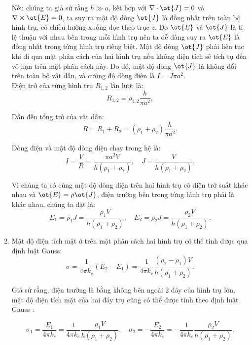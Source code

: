 \begin{loigiai}
\begin{enumerate}
{\begin{tikzpicture}[x=0.75pt,y=0.75pt,yscale=-1,xscale=1]
\end{tikzpicture}}
Nếu chúng ta giả sử rằng $h \gg a$, kết hợp với $\nabla\cdot \ot{J}=0$ và $\nabla \times \ot{E}=0$, ta suy ra mật độ dòng $\ot{J}$ là đồng nhất trên toàn bộ hình trụ, có chiều hướng xuống dọc theo trục $z$. Do $\ot{E}$ và $\ot{J}$ là tỉ lệ thuận với nhau bên trong mỗi hình trụ nên ta dễ dàng suy ra $\ot{E}$ là đồng nhất trong từng hình trụ riêng biệt. Mật độ dòng $\ot{J}$ phải liên tục khi đi qua mặt phân cách của hai hình trụ nếu không điện tích sẽ tích tụ đến vô hạn trên mặt phân cách này. Do đó, mật độ dòng $\ot{J}$ là không đổi trên toàn bộ vật dẫn, và cường độ dòng điện là $I= J\pi a^2$.\\
Điện trở của từng hình trụ $R_{1,2}$ lần lượt là:
   \[R_{1,2} = \rho_{1,2} \frac{h}{\pi a^2} , \tag{3} \]

Dẫn đến tổng trở của vật dẫn:
    \[R = R_1 + R_2 = (\rho_1 + \rho_2 ) \frac{h}{\pi a^2}. \tag{4} \]

Dòng điện và mật độ dòng điện chạy trong hệ là:
    \[I = \frac{V}{R} = \frac{\pi a^2 V }{h(\rho_1 + \rho_2)}, \quad J = \frac{V}{h(\rho_1 + \rho_2)}. \tag{5} \]

Vì chúng ta có cùng mật độ dòng điện trên hai hình trụ có điện trở suất khác nhau và $\ot{E} = \rho \ot{J}$, điện trường bên trong từng hình trụ phải là khác nhau, chúng ta đặt là:
   \[ E_1 = \rho_1 J = \frac{\rho_1 V}{h(\rho_1 + \rho_2)} , \quad E_2 =\rho_2 J = \frac{\rho_2 V}{h(\rho_1 + \rho_2)}. \tag{6} \]

\item Mật độ điện tích mặt ở trên mặt phân cách hai hình trụ có thể tính được qua định luật Gauss:
  \[\sigma = \frac{1}{4\pi k_e} (E_2 - E_1) = \frac{1}{4\pi k_e} \frac{(\rho_2 - \rho_1)V}{h(\rho_1 +\rho_2)} . \tag{7} \]

Giả sử rằng, điện trường là bằng không bên ngoài 2 đáy của hình trụ lớn, mật độ điện tích mặt của hai đáy trụ cũng có thể được tính theo định luật Gauss :
  
   \[\sigma_1 = \frac{E_1}{4\pi k_e }= \frac{1}{4\pi k_e} \frac{\rho_1 V}{h(\rho_1 + \rho_2)} , \quad \sigma_2 = - \frac{E_2}{4\pi k_e}= - \frac{1}{4\pi k_e} \frac{\rho_2 V}{h(\rho_1 + \rho_2)} . \tag{8}\]
                 
    
\end{enumerate}
\end{loigiai}


